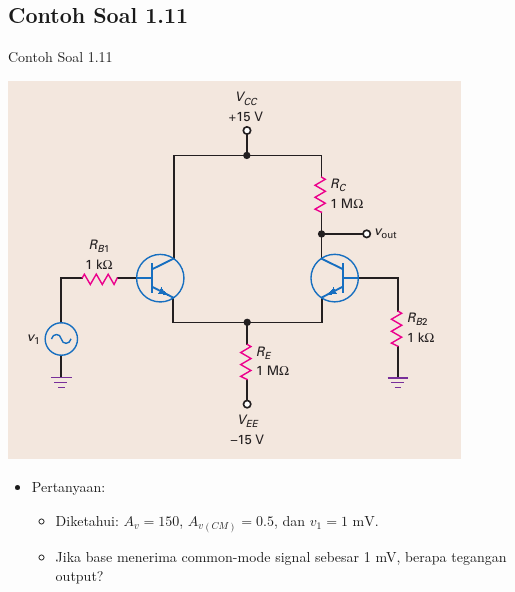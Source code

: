 \documentclass[aspectratio=169]{beamer}
\begin{document}
\subsection{Contoh Soal 1.11}
\begin{frame}{Contoh Soal 1.11}
	\begin{multicols}{2}
		\begin{center}
			\includegraphics[height=0.7\textheight]{gambar/01.fig22}
		\end{center}
		\columnbreak
		\begin{itemize}
			\item Pertanyaan:
			\begin{itemize}
				\item Diketahui: $ A_v = 150 $, $ A_{v(CM)} = 0.5 $, dan $ v_1 = 1 \text{ mV} $.
				\item Jika base menerima common-mode signal sebesar 1 mV, berapa tegangan output?
			\end{itemize}
		\end{itemize}
	\end{multicols}
\end{frame}
\end{document}
